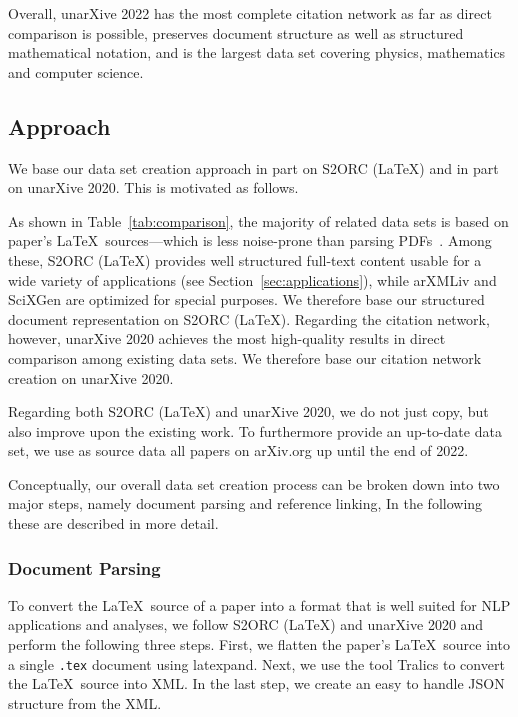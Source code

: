 Overall, unarXive 2022 has the most complete citation network as far as direct comparison is possible, preserves document structure as well as structured mathematical notation, and is the largest data set covering physics, mathematics and computer science.

\subsection{Approach}

We base our data set creation approach in part on S2ORC (\LaTeX) and in part on unarXive 2020. This is motivated as follows.

As shown in Table~\ref{tab:comparison}, the majority of related data sets is based on paper's \LaTeX\ sources---which is less noise-prone than parsing PDFs~\cite{Bast2017}. Among these, S2ORC (\LaTeX) provides well structured full-text content usable for a wide variety of applications (see Section~\ref{sec:applications}), while arXMLiv and SciXGen are optimized for special purposes. We therefore base our structured document representation on S2ORC (\LaTeX). Regarding the citation network, however, unarXive 2020 achieves the most high-quality results in direct comparison among existing data sets. We therefore base our citation network creation on unarXive 2020.

Regarding both S2ORC (\LaTeX) and unarXive 2020, we do not just copy, but also improve upon the existing work. To furthermore provide an up-to-date data set, we use as source data all papers on arXiv.org up until the end of 2022.

Conceptually, our overall data set creation process can be broken down into two major steps, namely document parsing and reference linking, In the following these are described in more detail.

\subsubsection{Document Parsing}
To convert the \LaTeX\ source of a paper into a format that is well suited for NLP applications and analyses, we follow S2ORC (\LaTeX) and unarXive 2020 and perform the following three steps. First, we flatten the paper's \LaTeX\ source into a single \texttt{.tex} document using latexpand. Next, we use the tool Tralics to convert the \LaTeX\ source into XML. In the last step, we create an easy to handle JSON structure from the XML.

